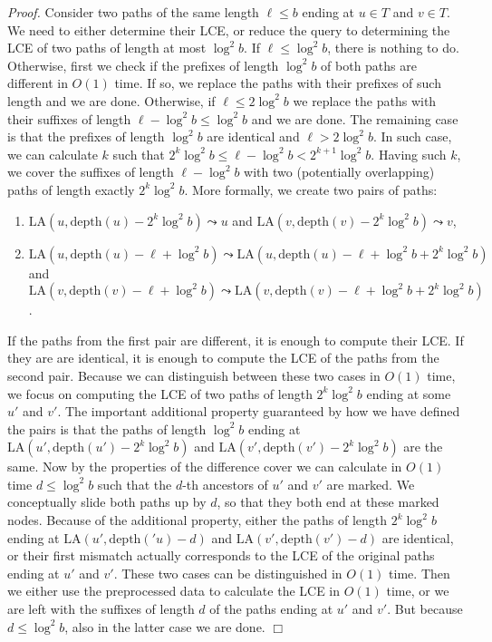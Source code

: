 \documentclass [10pt]{article}
\newcommand{\qed}{\hfill\ensuremath{\Box}\medskip\\\noindent}
\newenvironment{proof}{\noindent\emph{Proof. }}{}
\newcommand{\depth}{\ensuremath{\mathrm{depth}}}
\newcommand{\LA}{\ensuremath{\mathrm{LA}}}
\begin{document}
\begin{proof}
Consider two paths of the same length $\ell \leq b$ ending at $u\in T$ and $v\in T$. We need to either determine their
LCE, or reduce the query to determining the LCE of two paths of length at most $\log^{2}b$.
If $\ell \leq \log^{2}b$, there is nothing to do.
Otherwise, first we check if the prefixes of length $\log^{2}b$ of both paths are different in $O(1)$ time. If so, we replace the paths
with their prefixes of such length and we are done. Otherwise, if $\ell \leq 2\log^{2}b$ we replace the paths with their suffixes of length
$\ell-\log^{2}b \leq \log^{2}b$ and we are done. The remaining case is that the prefixes of length
$\log^{2}b$ are identical and $\ell > 2\log^{2}b$. In such case, we can calculate $k$ such that
$2^{k}\log^{2}b \leq \ell-\log^{2}b < 2^{k+1}\log^{2}b$. Having such $k$, we cover the suffixes of length $\ell-\log^{2}b$ with two
(potentially overlapping) paths of length exactly $2^{k}\log^{2}b$. More formally, we create two pairs of paths:
\begin{enumerate}
\item $\LA(u,\depth(u)-2^{k}\log^{2}b) \leadsto u$ and $\LA(v,\depth(v)-2^{k}\log^{2}b) \leadsto v$,
\item $\LA(u,\depth(u)-\ell+\log^{2}b) \leadsto \LA(u,\depth(u)-\ell+\log^{2}b+2^{k}\log^{2}b)$ and $\LA(v,\depth(v)-\ell+\log^{2}b) \leadsto \LA(v,\depth(v)-\ell+\log^{2}b+2^{k}\log^{2}b)$.
\end{enumerate}
If the paths from the first pair are different, it is enough to compute their LCE. If they are are identical, it is enough to
compute the LCE of the paths from the second pair. Because we can distinguish between these two cases in $O(1)$ time,
we focus on computing the LCE of two paths of length $2^{k}\log^{2}b$ ending at some $u'$ and $v'$.
The important additional property guaranteed by how we have defined the pairs is that the paths of length $\log^{2}b$ ending at
$\LA(u',\depth(u')-2^{k}\log^{2}b)$ and $\LA(v',\depth(v')-2^{k}\log^{2}b)$ are the same. Now by the properties of the difference cover
we can calculate in $O(1)$ time $d\leq \log^{2}b$ such that the $d$-th ancestors of $u'$ and $v'$ are marked. We conceptually slide both paths up
by $d$, so that they both end at these marked nodes. Because of the additional property, either the paths of length $2^{k}\log^{2}b$ ending at
$\LA(u',\depth('u)-d)$ and $\LA(v',\depth(v')-d)$ are identical, or their first mismatch actually corresponds to the LCE
of the original paths ending at $u'$ and $v'$. These two cases can be distinguished in $O(1)$ time. Then we either use the preprocessed data
to calculate the LCE in $O(1)$ time, or we are left with the suffixes of length $d$ of the paths ending at $u'$ and $v'$.
But because $d\leq\log^{2}b$, also in the latter case we are done.
\qed
\end{proof}
\end{document}
